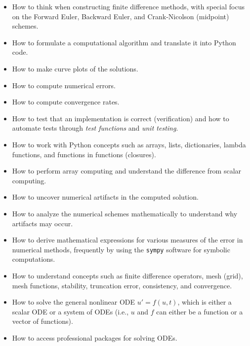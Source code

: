 \documentclass[graybox,sectrefs,envcountresetchap,open=right,final]{svmonodo}
\begin{document}
\begin{itemize}
 \item How to think when constructing finite difference methods, with special focus on the Forward Euler, Backward Euler, and Crank-Nicolson (midpoint) schemes.

 \item How to formulate a computational algorithm and translate it into Python code.

 \item How to make curve plots of the solutions.

 \item How to compute numerical errors.

 \item How to compute convergence rates.

 \item How to test that an implementation is correct (verification) and how to automate tests through \emph{test functions} and \emph{unit testing}.

 \item How to work with Python concepts such as arrays, lists, dictionaries, lambda functions, and functions in functions (closures).

 \item How to perform array computing and understand the difference from scalar computing.

 \item How to uncover numerical artifacts in the computed solution.

 \item How to analyze the numerical schemes mathematically to understand why artifacts may occur.

 \item How to derive mathematical expressions for various measures of the error in numerical methods, frequently by using the \texttt{sympy} software for symbolic computations.

 \item How to understand concepts such as finite difference operators, mesh (grid), mesh functions, stability, truncation error, consistency, and convergence.

 \item How to solve the general nonlinear ODE $u'=f(u,t)$, which is either a scalar ODE or a system of ODEs (i.e., $u$ and $f$ can either be a function or a vector of functions).

 \item How to access professional packages for solving ODEs.


\end{itemize}
\end{document}
